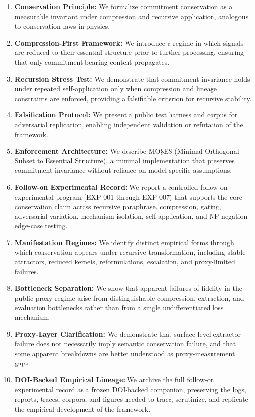 \documentclass[11pt,a4paper]{article}
\begin{document}
\begin{enumerate}
    \item \textbf{Conservation Principle:} We formalize commitment conservation as a measurable invariant under compression and recursive application, analogous to conservation laws in physics.

    \item \textbf{Compression-First Framework:} We introduce a regime in which signals are reduced to their essential structure prior to further processing, ensuring that only commitment-bearing content propagates.

    \item \textbf{Recursion Stress Test:} We demonstrate that commitment invariance holds under repeated self-application only when compression and lineage constraints are enforced, providing a falsifiable criterion for recursive stability.

    \item \textbf{Falsification Protocol:} We present a public test harness and corpus for adversarial replication, enabling independent validation or refutation of the framework.

    \item \textbf{Enforcement Architecture:} We describe MO\S{}ES\texttrademark{} (Minimal Orthogonal Subset to Essential Structure), a minimal implementation that preserves commitment invariance without reliance on model-specific assumptions.

    \item \textbf{Follow-on Experimental Record:} We report a controlled follow-on experimental program (EXP-001 through EXP-007) that supports the core conservation claim across recursive paraphrase, compression, gating, adversarial variation, mechanism isolation, self-application, and NP-negation edge-case testing.

    \item \textbf{Manifestation Regimes:} We identify distinct empirical forms through which conservation appears under recursive transformation, including stable attractors, reduced kernels, reformulations, escalation, and proxy-limited failures.

    \item \textbf{Bottleneck Separation:} We show that apparent failures of fidelity in the public proxy regime arise from distinguishable compression, extraction, and evaluation bottlenecks rather than from a single undifferentiated loss mechanism.

    \item \textbf{Proxy-Layer Clarification:} We demonstrate that surface-level extractor failure does not necessarily imply semantic conservation failure, and that some apparent breakdowns are better understood as proxy-measurement gaps.

    \item \textbf{DOI-Backed Empirical Lineage:} We archive the full follow-on experimental record as a frozen DOI-backed companion, preserving the logs, reports, traces, corpora, and figures needed to trace, scrutinize, and replicate the empirical development of the framework.
\end{enumerate}
\end{document}
